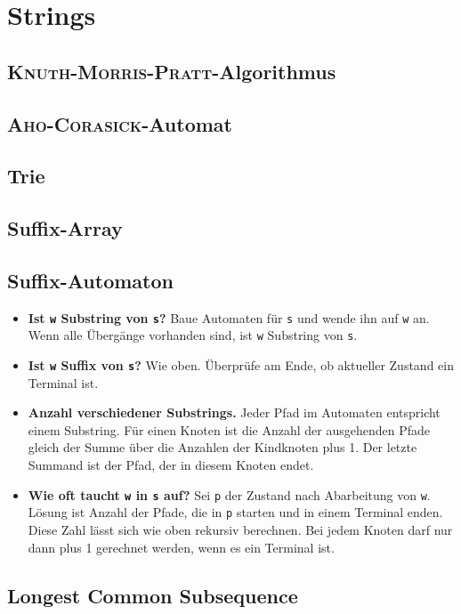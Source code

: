 \section{Strings}

\subsection{\textsc{Knuth-Morris-Pratt}-Algorithmus}


\subsection{\textsc{Aho-Corasick}-Automat}


\subsection{Trie}


\subsection{Suffix-Array}


\subsection{Suffix-Automaton}

\begin{itemize}[nosep]
	\item \textbf{Ist \lstinline{w} Substring von \lstinline{s}?}
	Baue Automaten für \lstinline{s} und wende ihn auf \lstinline{w} an.
	Wenn alle Übergänge vorhanden sind, ist \lstinline{w} Substring von \lstinline{s}.

	\item \textbf{Ist \lstinline{w} Suffix von \lstinline{s}?}
	Wie oben.
	Überprüfe am Ende, ob aktueller Zustand ein Terminal ist.

	\item \textbf{Anzahl verschiedener Substrings.}
	Jeder Pfad im Automaten entspricht einem Substring.
	Für einen Knoten ist die Anzahl der ausgehenden Pfade gleich der Summe über die Anzahlen der Kindknoten plus 1.
	Der letzte Summand ist der Pfad, der in diesem Knoten endet.

	\item \textbf{Wie oft taucht \lstinline{w} in \lstinline{s} auf?}
	Sei \lstinline{p} der Zustand nach Abarbeitung von \lstinline{w}.
	Lösung ist Anzahl der Pfade, die in \lstinline{p} starten und in einem Terminal enden.
	Diese Zahl lässt sich wie oben rekursiv berechnen.
	Bei jedem Knoten darf nur dann plus 1 gerechnet werden, wenn es ein Terminal ist.
\end{itemize}

\subsection{Longest Common Subsequence}

